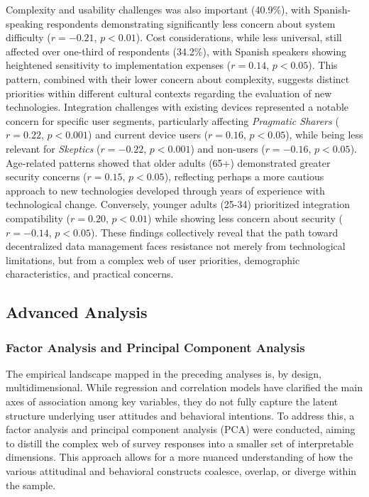 		Complexity and usability challenges was also important (40.9\%), with Spanish-speaking respondents demonstrating significantly less concern about system difficulty ($r = -0.21$, $p < 0.01$). 
		Cost considerations, while less universal, still affected over one-third of respondents (34.2\%), with Spanish speakers showing heightened sensitivity to implementation expenses ($r = 0.14$, $p < 0.05$). This pattern, combined with their lower concern about complexity, suggests distinct priorities within different cultural contexts regarding the evaluation of new technologies.
		Integration challenges with existing devices represented a notable concern for specific user segments, particularly affecting \textit{Pragmatic Sharers} ($r = 0.22$, $p < 0.001$) and current device users ($r = 0.16$, $p < 0.05$), while being less relevant for \textit{Skeptics} ($r = -0.22$, $p < 0.001$) and non-users ($r = -0.16$, $p < 0.05$). 
		Age-related patterns showed that older adults (65+) demonstrated greater security concerns ($r = 0.15$, $p < 0.05$), reflecting perhaps a more cautious approach to new technologies developed through years of experience with technological change. Conversely, younger adults (25-34) prioritized integration compatibility ($r = 0.20$, $p < 0.01$) while showing less concern about security ($r = -0.14$, $p < 0.05$).
		These findings collectively reveal that the path toward decentralized data management faces resistance not merely from technological limitations, but from a complex web of user priorities, demographic characteristics, and practical concerns.
\subsection{Advanced Analysis}
	\subsubsection{Factor Analysis and Principal Component Analysis}
	The empirical landscape mapped in the preceding analyses is, by design, multidimensional. While regression and correlation models have clarified the main axes of association among key variables, they do not fully capture the latent structure underlying user attitudes and behavioral intentions. To address this, a factor analysis and principal component analysis (PCA) were conducted, aiming to distill the complex web of survey responses into a smaller set of interpretable dimensions. This approach allows for a more nuanced understanding of how the various attitudinal and behavioral constructs coalesce, overlap, or diverge within the sample.

